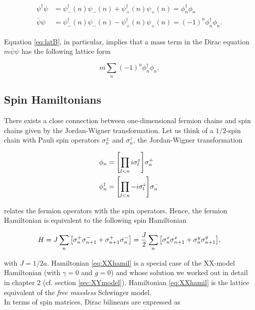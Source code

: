 \begin{align}
	\psi^\dagger\psi &=\psi_-^\dagger(n)\psi_-(n) + \psi_+^\dagger(n)\psi_+(n) = \phi_n^\dagger\phi_n\nonumber\\
	\bar\psi\psi &= \psi_-^\dagger(n)\psi_-(n) - \psi_+^\dagger(n)\psi_+ (n)= (-1)^n\phi_n^\dagger\phi_n.\label{eq:latB}
\end{align}

Equation \eqref{eq:latB}, in particular, implies that a mass term in the Dirac equation $m\bar\psi\psi$ has the following lattice form

\begin{equation}
    m\sum_n (-1)^n\phi_n^\dagger\phi_n.
\end{equation}

\subsection{Spin Hamiltonians}

There exists a close connection between one-dimensional fermion chains and spin chains given by the Jordan-Wigner transformation. Let us think of a $1/2$-spin chain with Pauli spin operators $\sigma^\pm_n$ and $\sigma^z_n$, the Jordan-Wigner transformation  

\begin{align}
	\phi_n &= \qty[\prod_{l<n}i\sigma^z_l]\sigma^+_n\nonumber\\
	\phi_n^\dagger &= \qty[\prod_{l<n}-i\sigma^z_l]\sigma^-_n\label{eq:JWtrans}
\end{align}

relates the fermion operators with the spin operators. Hence, the fermion Hamiltonian is equivalent to the following spin Hamiltonian

\begin{equation}
H = J\sum_n \qty[\sigma^+_n\sigma^-_{n+1} + \sigma^+_{n+1}\sigma^-_n] = \frac{J}{2}\sum_n\qty[\sigma^x_n \sigma^x_{n+1} + \sigma^y_n \sigma^y_{n+1}],\label{eq:XXhamil}
\end{equation}

with $J=1/2a$. Hamiltonian \eqref{eq:XXhamil} is a special case of the XX-model Hamiltonian (with $\gamma=0$ and $g=0$) and whose solution we worked out in detail in chapter 2 (cf. section \ref{sec:XYmodel}). Hamiltonian \eqref{eq:XXhamil} is the lattice equivalent of the \emph{free massless} Schwinger model.\\

In terms of spin matrices, Dirac bilinears are expressed as 

